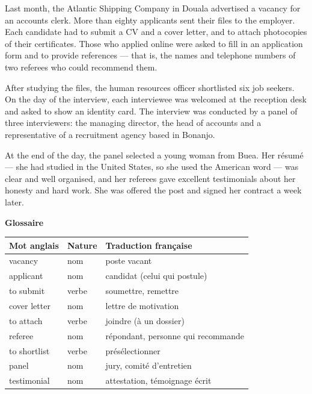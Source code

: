 \documentclass[11pt]{article}
\newcommand{\cle}[1]{{\popxbold\color{popdark}#1}}
\begin{document}
\begin{textebox}
Last month, the Atlantic Shipping Company in Douala advertised a \cle{vacancy} for an accounts clerk. More than eighty \cle{applicants} sent their files to the \cle{employer}. Each \cle{candidate} had to \cle{submit a CV} and a \cle{cover letter}, and to \cle{attach} photocopies of their \cle{certificates}. Those who applied online were asked to \cle{fill in an application form} and to \cle{provide references} — that is, the names and telephone numbers of two \cle{referees} who could recommend them.

After studying the files, the human resources officer shortlisted six \cle{job seekers}. On the day of the interview, each \cle{interviewee} was welcomed at the reception desk and asked to show an \cle{identity card}. The \cle{interview} was conducted by a \cle{panel} of three \cle{interviewers}: the managing director, the head of accounts and a representative of a \cle{recruitment agency} based in Bonanjo.

At the end of the day, the panel selected a young woman from Buea. Her \cle{résumé} — she had studied in the United States, so she used the American word — was clear and well organised, and her referees gave excellent \cle{testimonials} about her honesty and hard work. She was offered the \cle{post} and signed her contract a week later.
\end{textebox}

\textbf{Glossaire}\par

\begin{center}
\begin{tabularx}{\linewidth}{|l|l|X|}
\hline
\rowcolor{popblueL} \textbf{Mot anglais} & \textbf{Nature} & \textbf{Traduction française} \\
\hline
vacancy & nom & poste vacant \\
\hline
applicant & nom & candidat (celui qui postule) \\
\hline
to submit & verbe & soumettre, remettre \\
\hline
cover letter & nom & lettre de motivation \\
\hline
to attach & verbe & joindre (à un dossier) \\
\hline
referee & nom & répondant, personne qui recommande \\
\hline
to shortlist & verbe & présélectionner \\
\hline
panel & nom & jury, comité d'entretien \\
\hline
testimonial & nom & attestation, témoignage écrit \\
\hline
\end{tabularx}
\end{center}
\end{document}
